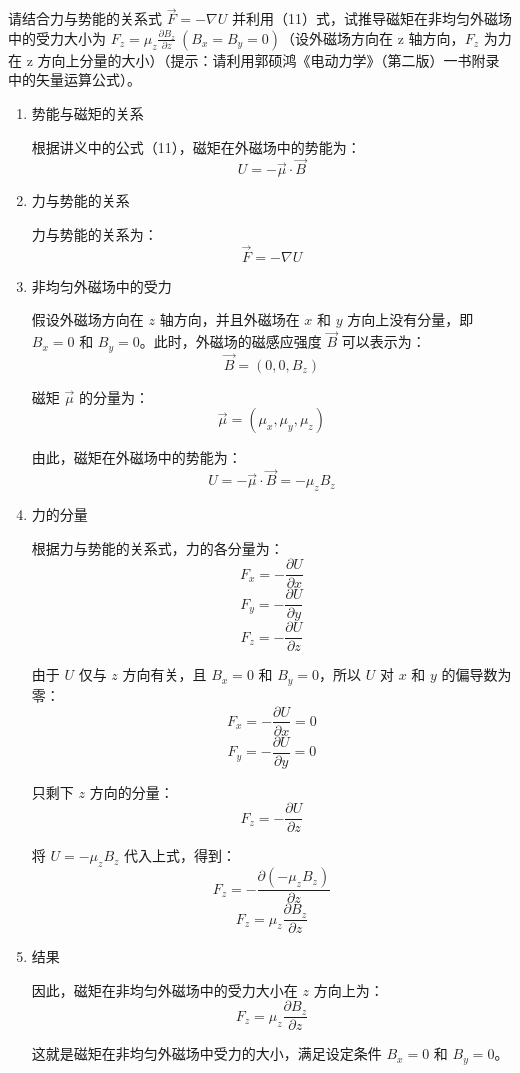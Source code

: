\documentclass[dvipsnames, svgnames,a4paper,11pt]{article}
\begin{document}
	
	\begin{question}
		请结合力与势能的关系式 $\vec{F} = -\nabla U $ 并利用（11）式，试推导磁矩在非均匀外磁场中的受力大小为 $F_z = \mu_z \frac{\partial B_z}{\partial z} \ (B_x = B_y = 0)$（设外磁场方向在 z 轴方向，$F_z$ 为力在 z 方向上分量的大小）（提示：请利用郭硕鸿《电动力学》（第二版）一书附录中的矢量运算公式）。
	\end{question}
	\begin{enumerate}
		\item 势能与磁矩的关系
		
		根据讲义中的公式（11），磁矩在外磁场中的势能为：
		\[ U = -\vec{\mu} \cdot \vec{B} \]
		
		\item 力与势能的关系
		
		力与势能的关系为：
		\[ \vec{F} = -\nabla U \]
		
		\item 非均匀外磁场中的受力
		
		假设外磁场方向在 \(z\) 轴方向，并且外磁场在 \(x\) 和 \(y\) 方向上没有分量，即 \(B_x = 0\) 和 \(B_y = 0\)。此时，外磁场的磁感应强度 \(\vec{B}\) 可以表示为：
		\[ \vec{B} = (0, 0, B_z) \]
		
		磁矩 \(\vec{\mu}\) 的分量为：
		\[ \vec{\mu} = (\mu_x, \mu_y, \mu_z) \]
		
		由此，磁矩在外磁场中的势能为：
		\[ U = -\vec{\mu} \cdot \vec{B} = -\mu_z B_z \]
		
		\item 力的分量
		
		根据力与势能的关系式，力的各分量为：
		\[ F_x = -\frac{\partial U}{\partial x} \]
		\[ F_y = -\frac{\partial U}{\partial y} \]
		\[ F_z = -\frac{\partial U}{\partial z} \]
		
		由于 \(U\) 仅与 \(z\) 方向有关，且 \(B_x = 0\) 和 \(B_y = 0\)，所以 \(U\) 对 \(x\) 和 \(y\) 的偏导数为零：
		\[ F_x = -\frac{\partial U}{\partial x} = 0 \]
		\[ F_y = -\frac{\partial U}{\partial y} = 0 \]
		
		只剩下 \(z\) 方向的分量：
		\[ F_z = -\frac{\partial U}{\partial z} \]
		
		将 \(U = -\mu_z B_z\) 代入上式，得到：
		\[ F_z = -\frac{\partial (-\mu_z B_z)}{\partial z} \]
		\[ F_z = \mu_z \frac{\partial B_z}{\partial z} \]
		
		\item 结果
		
		因此，磁矩在非均匀外磁场中的受力大小在 \(z\) 方向上为：
		\[ F_z = \mu_z \frac{\partial B_z}{\partial z} \]
		
		这就是磁矩在非均匀外磁场中受力的大小，满足设定条件 \(B_x = 0\) 和 \(B_y = 0\)。
	\end{enumerate}
	
\end{document}
